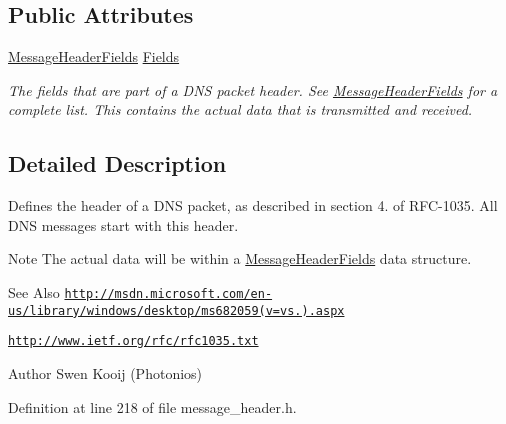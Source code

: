 \subsection*{Public Attributes}
\begin{DoxyCompactItemize}
\item 
\hyperlink{struct_senergy_1_1_dns_1_1_message_header_fields}{Message\-Header\-Fields} \hyperlink{class_senergy_1_1_dns_1_1_message_header_a014c173ce2b2c5bb06ae9e5d0e201159}{Fields}
\begin{DoxyCompactList}\small\item\em The fields that are part of a D\-N\-S packet header. See \hyperlink{struct_senergy_1_1_dns_1_1_message_header_fields}{Message\-Header\-Fields} for a complete list. This contains the actual data that is transmitted and received. \end{DoxyCompactList}\end{DoxyCompactItemize}


\subsection{Detailed Description}
Defines the header of a D\-N\-S packet, as described in section 4. of R\-F\-C-\/1035. All D\-N\-S messages start with this header. 

\begin{DoxyNote}{Note}
The actual data will be within a \hyperlink{struct_senergy_1_1_dns_1_1_message_header_fields}{Message\-Header\-Fields} data structure.
\end{DoxyNote}
\begin{DoxySeeAlso}{See Also}
\href{http://msdn.microsoft.com/en-us/library/windows/desktop/ms682059(v=vs.85).aspx}{\tt http\-://msdn.\-microsoft.\-com/en-\/us/library/windows/desktop/ms682059(v=vs.).\-aspx} 

\href{http://www.ietf.org/rfc/rfc1035.txt}{\tt http\-://www.\-ietf.\-org/rfc/rfc1035.\-txt}
\end{DoxySeeAlso}
\begin{DoxyAuthor}{Author}
Swen Kooij (Photonios) 
\end{DoxyAuthor}


Definition at line 218 of file message\-\_\-header.\-h.



